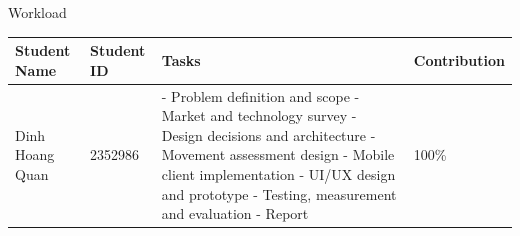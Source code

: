 \begin{preface}{Workload}
  \begin{table}[h]
    \centering
    \renewcommand{\arraystretch}{1.4}
    \begin{tabular}{|p{4.2cm}|p{2.4cm}|p{5.2cm}|p{2.4cm}|}
      \hline
      \textbf{Student Name} & \textbf{Student ID} & \textbf{Tasks} & \textbf{Contribution} \\
      \hline
      Dinh Hoang Quan & 2352986 &
        - Problem definition and scope \newline
        - Market and technology survey \newline
        - Design decisions and architecture \newline
        - Movement assessment design \newline
        - Mobile client implementation \newline
        - UI/UX design and prototype \newline
        - Testing, measurement and evaluation \newline
        - Report
        & 100\% \\
      \hline
    \end{tabular}
  \end{table}
\end{preface}
